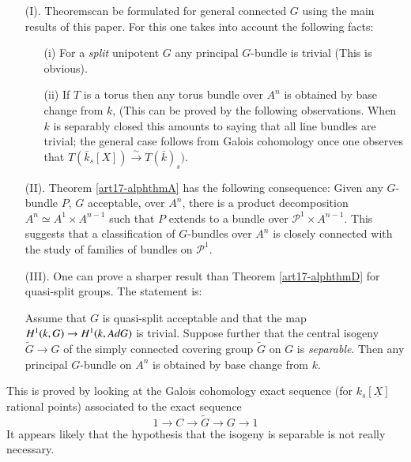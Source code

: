 \begin{remarks*}
\begin{enumerate}
\item[(I).] Theorems\pageoriginale can be formulated for general connected $G$ using the main results of this paper. For this one takes into account the following facts:
\begin{itemize}
\item[(i)] For a {\em split} unipotent $G$ any principal $G$-bundle is trivial (This is obvious).

\item[(ii)] If $T$ is a torus then any torus bundle over $A^n$ is obtained by base change from $k$, (This can be proved by the following observations. When $k$ is separably closed this amounts to saying that all line bundles are trivial; the general case follows from Galois cohomology once one observes that $T (\bar{k}_s [X]) \xrightarrow{\sim} T (\bar{k})_s)$.
\end{itemize}

\item[(II).] Theorem \ref{art17-alphthmA} has the following consequence: Given any $G$-bundle $P$, $G$ acceptable, over $A^n$, there is a product decomposition $A^n \simeq A^1 \times A^{n-1}$ such that $P$ extends to a bundle over $\mathscr{P}^1 \times A^{n-1}$. This suggests that a classification of $G$-bundles over $A^n$ is closely connected with the study of families of bundles on $\mathscr{P}^1$.

\item[(III).] One can prove a sharper result than Theorem \ref{art17-alphthmD} for quasi-split groups. The statement is:

Assume that $G$ is quasi-split acceptable and that the map $H^1 (k,G)\break \to H^1 (k, AdG)$ is trivial. Suppose further that the central isogeny $\tilde{G} \to G$ of the simply connected covering group $\tilde{G}$ on $G$ is {\em separable}. Then any principal $G$-bundle on $A^n$ is obtained by base change from $k$.

\end{enumerate}
\end{remarks*}

This is proved by looking at the Galois cohomology exact sequence (for $k_s[\underline{X}]$ rational points) associated to the exact sequence
$$
1 \to C \to \tilde{G} \to G \to 1
$$
It appears likely that the hypothesis that the isogeny is separable is not really necessary.

